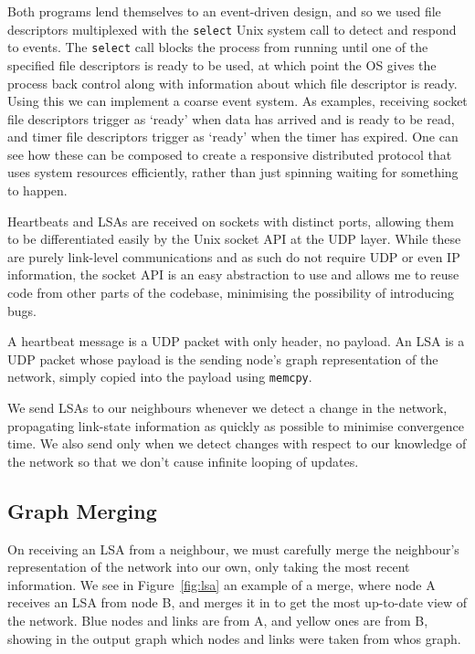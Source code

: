 \documentclass[withindex,glossary,openany]{cam-thesis}
\begin{document}
Both programs lend themselves to an event-driven design, and so we used file descriptors multiplexed with the \texttt{select} Unix system call to detect and respond to events. The \texttt{select} call blocks the process from running until one of the specified file descriptors is ready to be used, at which point the OS gives the process back control along with information about which file descriptor is ready. Using this we can implement a coarse event system. As examples, receiving socket file descriptors trigger as `ready' when data has arrived and is ready to be read, and timer file descriptors trigger as `ready' when the timer has expired. One can see how these can be composed to create a responsive distributed protocol that uses system resources efficiently, rather than just spinning waiting for something to happen.

Heartbeats and LSAs are received on sockets with distinct ports, allowing them to be differentiated easily by the Unix socket API at the UDP layer. While these are purely link-level communications and as such do not require UDP or even IP information, the socket API is an easy abstraction to use and allows me to reuse code from other parts of the codebase, minimising the possibility of introducing bugs.

A heartbeat message is a UDP packet with only header, no payload. An LSA is a UDP packet whose payload is the sending node's graph representation of the network, simply copied into the payload using \texttt{memcpy}.

We send LSAs to our neighbours whenever we detect a change in the network, propagating link-state information as quickly as possible to minimise convergence time. We also send only when we detect changes with respect to our knowledge of the network so that we don't cause infinite looping of updates.

\subsection{Graph Merging}

On receiving an LSA from a neighbour, we must carefully merge the neighbour's representation of the network into our own, only taking the most recent information. We see in Figure~\ref{fig:lsa} an example of a merge, where node A receives an LSA from node B, and merges it in to get the most up-to-date view of the network. Blue nodes and links are from A, and yellow ones are from B, showing in the output graph which nodes and links were taken from whos graph.
\end{document}
